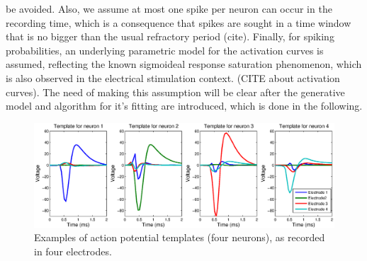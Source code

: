 \documentclass[12pt,letterpaper,fleqn]{article}
\begin{document}
be avoided.  Also, we assume at most one spike per neuron can occur in the recording time, which is a consequence that spikes are sought in a time window that is no bigger than the usual refractory period (cite). Finally, for spiking probabilities, an underlying parametric model for the activation curves is assumed, reflecting the known sigmoideal response saturation phenomenon, which is also observed in the electrical stimulation context. (CITE about activation curves). The need of making this assumption will be clear after the generative model and algorithm for it's fitting are introduced, which is done in the following. 
\begin{figure}[ht]
          \centering
                \includegraphics[width=1\textwidth]{4templates.eps} 
                \caption{Examples of action potential templates (four neurons), as recorded in four electrodes.}
\end{figure}
\end{document}
